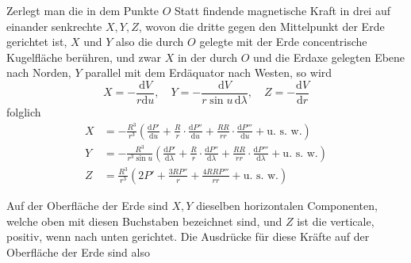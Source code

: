 Zerlegt man die in dem Punkte $O$ Statt findende magnetische Kraft in drei auf einander senkrechte $X,Y,Z$, wovon die dritte gegen den Mittelpunkt der Erde gerichtet ist, $X$ und $Y$ also die durch $O$ gelegte mit der Erde concentrische Kugelfläche berühren, und zwar $X$ in der durch $O$ und die Erdaxe gelegten Ebene nach Norden, $Y$ parallel mit dem Erdäquator nach Westen, so wird
\[
X=-\frac{\mathrm{d}V}{r\mathrm{d}u},\quad Y=-\frac{\mathrm{d}V}{r\sin u\,\mathrm{d}\lambda},\quad Z=-\frac{\mathrm{d}V}{\mathrm{d}r}
\]
folglich
\[
\begin{aligned}
X&=-\frac{R^3}{r^3}\left(\frac{\mathrm{d}P'}{\mathrm{d}u}+\frac Rr\cdot\frac{\mathrm{d}P''}{\mathrm{d}u}+\frac{RR}{rr}\cdot\frac{\mathrm{d}P'''}{\mathrm{d}u}+\text{u. s. w.}\right)\\
Y&=-\frac{R^3}{r^3\sin u}\left(\frac{\mathrm{d}P'}{\mathrm{d}\lambda}+\frac Rr\cdot\frac{\mathrm{d}P''}{\mathrm{d}\lambda}+\frac{RR}{rr}\cdot\frac{\mathrm{d}P'''}{\mathrm{d}\lambda}+\text{u. s. w.}\right)\\
Z&=\frac{R^3}{r^3}\left(2P'+\frac{3RP''}{r}+\frac{4RRP'''}{rr}+\text{u. s. w.}\right)
\end{aligned}
\]

Auf der Oberfläche der Erde sind $X,Y$ dieselben horizontalen Componenten, welche oben mit diesen Buchstaben bezeichnet sind, und $Z$ ist die verticale, positiv, wenn nach unten gerichtet. Die Ausdrücke für diese Kräfte auf der Oberfläche der Erde sind also
